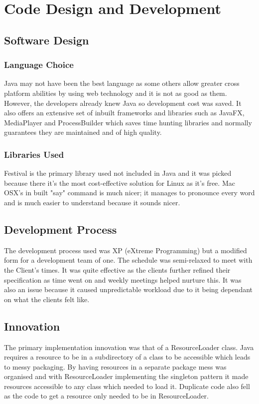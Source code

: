 \documentclass[conference]{IEEEtran}
\begin{document}
	\section{Code Design and Development}
	\subsection{Software Design}
	\subsubsection{Language Choice}
	Java may not have been the best language as some others allow greater cross platform abilities by using web technology and it is not as good as them. However, the developers already knew Java so development cost was saved. It also offers an extensive set of inbuilt frameworks and libraries such as JavaFX, MediaPlayer and ProcessBuilder which saves time hunting libraries and normally guarantees they are maintained and of high quality.
	\subsubsection{Libraries Used}
	Festival is the primary library used not included in Java and it was picked because there it's the most cost-effective solution for Linux as it's free. Mac OSX's in built "say" command is much nicer; it manages to pronounce every word and is much easier to understand because it sounds nicer.
	\subsection{Development Process}
	The development process used was XP (eXtreme Programming) but a modified form for a development team of one. The schedule was semi-relaxed to meet with the Client's times. It was quite effective as the clients further refined their specification as time went on and weekly meetings helped nurture this. It was also an issue because it caused unpredictable workload due to it being dependant on what the clients felt like.
	\subsection{Innovation}
	The primary implementation innovation was that of a ResourceLoader class. Java requires a resource to be in a subdirectory of a class to be accessible which leads to messy packaging. By having resources in a separate package mess was organised and with ResourceLoader implementing the singleton pattern it made resources accessible to any class which needed to load it. Duplicate code also fell as the code to get a resource only needed to be in ResourceLoader.
\end{document}
